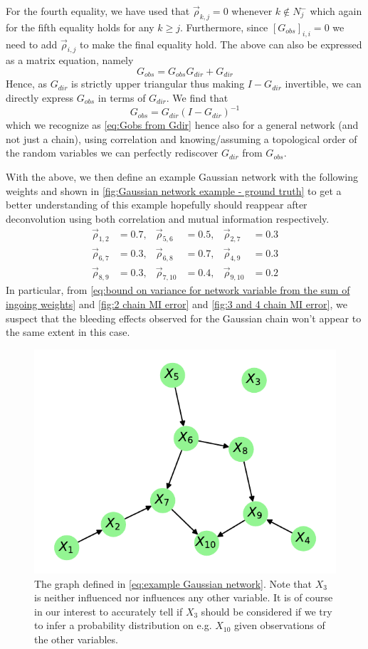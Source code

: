 \documentclass[../Thesis.tex]{subfiles}
\begin{document}
For the fourth equality, we have used that $\vec{\rho}_{k,j} = 0$ whenever $k \not\in N^-_j$ which again for the fifth equality holds for any $k \geq j$. Furthermore, since $\left[G_{obs}\right]_{i,i} = 0$ we need to add $\vec{\rho}_{i,j}$ to make the final equality hold. The above can also be expressed as a matrix equation, namely
$$G_{obs} = G_{obs}G_{dir} + G_{dir}$$
Hence, as $G_{dir}$ is strictly upper triangular thus making $I - G_{dir}$ invertible, we can directly express $G_{obs}$ in terms of $G_{dir}$. We find that
\newpage
$$G_{obs} = G_{dir} \left(I - G_{dir}\right)^{-1}$$
which we recognize as \autoref{eq:Gobs from Gdir} hence also for a general network (and not just a chain), using correlation and knowing/assuming a topological order of the random variables we can perfectly rediscover $G_{dir}$ from $G_{obs}$.

With the above, we then define an example Gaussian network with the following weights and shown in \autoref{fig:Gaussian network example - ground truth} to get a better understanding of this example hopefully should reappear after deconvolution using both correlation and mutual information respectively.
\begin{equation}\label{eq:example Gaussian network}
    \begin{aligned}
        \vec{\rho}_{1,2} & = 0.7, & \vec{\rho}_{5,6}  & = 0.5, & \vec{\rho}_{2,7}  & = 0.3 \\
        \vec{\rho}_{6,7} & = 0.3, & \vec{\rho}_{6,8}  & = 0.7, & \vec{\rho}_{4,9}  & = 0.3 \\
        \vec{\rho}_{8,9} & = 0.3, & \vec{\rho}_{7,10} & = 0.4, & \vec{\rho}_{9,10} & = 0.2
    \end{aligned}
\end{equation}
In particular, from \autoref{eq:bound on variance for network variable from the sum of ingoing weights} and \autoref{fig:2 chain MI error} and \autoref{fig:3 and 4 chain MI error}, we suspect that the bleeding effects observed for the Gaussian chain won't appear to the same extent in this case.
\begin{figure}[H]
    \centering
    \includegraphics[width = .6\linewidth]{figures/Gaussian Network Theoretical/Network graph - ground truth.pdf}
    \caption{The graph defined in \autoref{eq:example Gaussian network}. Note that $X_3$ is neither influenced nor influences any other variable. It is of course in our interest to accurately tell if $X_3$ should be considered if we try to infer a probability distribution on e.g. $X_{10}$ given observations of the other variables.}
    \label{fig:Gaussian network example - ground truth}
\end{figure}
\end{document}
